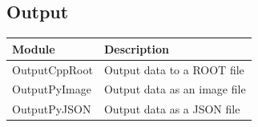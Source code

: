 \documentclass[a4paper,10pt]{article}
\begin{document}
  \subsection{Output}
    \begin{small}
    \noindent
      \renewcommand{\arraystretch}{1.5}
      \begin{tabular}{| l | l |}
        \hline
        \textbf{Module} & \textbf{Description} \\
        \hline
        OutputCppRoot & Output data to a ROOT file \\
        OutputPyImage & Output data as an image file \\
        OutputPyJSON & Output data as a JSON file \\
        \hline
      \end{tabular}
      \renewcommand{\arraystretch}{1.0}
    \end{small}

\end{document}

